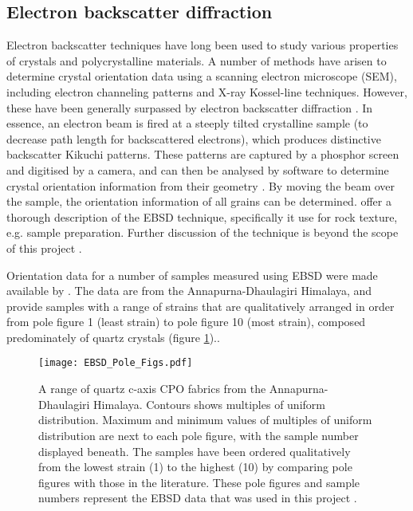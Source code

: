 \documentclass[a4paper,12pt]{report}
\numberwithin{equation}{chapter}
\begin{document}
\subsection{Electron backscatter diffraction}
Electron backscatter techniques have long been used to study various properties of crystals and polycrystalline materials. A number of methods have arisen to determine crystal orientation data using a scanning electron microscope (SEM), including electron channeling patterns and X-ray Kossel-line techniques. However, these have been generally surpassed by electron backscatter diffraction \citep[EBSD or backscatter Kikuchi diffraction,][]{Harland1973}.  In essence, an electron beam is fired at a steeply tilted crystalline sample (to decrease path length for backscattered electrons), which produces distinctive backscatter Kikuchi patterns. These patterns are captured by a phosphor screen and digitised by a camera, and can then be analysed by software to determine crystal orientation information from their geometry  \citep{Zaefferer2007}. By moving the beam over the sample, the orientation information of all grains can be determined. \cite{Prior1999} offer a thorough description of the EBSD technique, specifically it use for rock texture, e.g. sample preparation. Further discussion of the technique is beyond the scope of this project \citep[see][for more info]{Schwarzer1997,Randle2000}.    

Orientation data for a number of samples measured using EBSD were made available by \cite{ParsonsThesis}. The data are from the Annapurna-Dhaulagiri Himalaya, and provide samples with a range of strains that are qualitatively arranged in order from pole figure 1 (least strain) to pole figure 10 (most strain), composed predominately of quartz crystals (figure \ref{fig:EBSD_data}).. 

\begin{figure}[h!]
  \centering
    \texttt{[image: EBSD\_Pole\_Figs.pdf]}
  \caption[EBSD data (pole figures)]{A range of quartz c-axis CPO fabrics from the Annapurna-Dhaulagiri Himalaya. Contours shows multiples of uniform distribution. Maximum and minimum values of multiples of uniform distribution are next to each pole figure, with the sample number displayed beneath. The samples have been ordered qualitatively from the lowest strain (1) to the highest (10) by comparing pole figures with those in the literature. These pole figures and sample numbers represent the EBSD data that was used in this project \citep[made available from][]{ParsonsThesis}.}
  \label{fig:EBSD_data}
\end{figure}  
    
\end{document}
